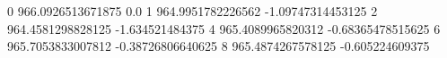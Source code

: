 0 966.0926513671875 0.0
1 964.9951782226562 -1.09747314453125
2 964.4581298828125 -1.634521484375
4 965.4089965820312 -0.68365478515625
6 965.7053833007812 -0.38726806640625
8 965.4874267578125 -0.605224609375
